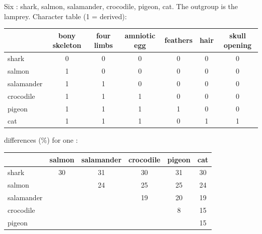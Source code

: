 \begin{problem}
\label{pb:g12:phylogenetic-trees:1}
Six : shark, salmon, salamander, crocodile, pigeon, cat. The
outgroup is the lamprey. Character table (1 = derived):

\begin{center}
\small
\begin{tabular}{lcccccc}
 & bony skeleton & four limbs & amniotic egg & feathers & hair & skull opening \\ \hline
shark & 0 & 0 & 0 & 0 & 0 & 0 \\
salmon & 1 & 0 & 0 & 0 & 0 & 0 \\
salamander & 1 & 1 & 0 & 0 & 0 & 0 \\
crocodile & 1 & 1 & 1 & 0 & 0 & 0 \\
pigeon & 1 & 1 & 1 & 1 & 0 & 0 \\
cat & 1 & 1 & 1 & 0 & 1 & 1 \\
\end{tabular}
\end{center}

 differences (\%) for one :

\begin{center}
\begin{tabular}{lccccc}
 & salmon & salamander & crocodile & pigeon & cat \\ \hline
shark & 30 & 31 & 30 & 31 & 30 \\
salmon & & 24 & 25 & 25 & 24 \\
salamander & & & 19 & 20 & 19 \\
crocodile & & & & 8 & 15 \\
pigeon & & & & & 15 \\
\end{tabular}
\end{center}


\end{problem}

